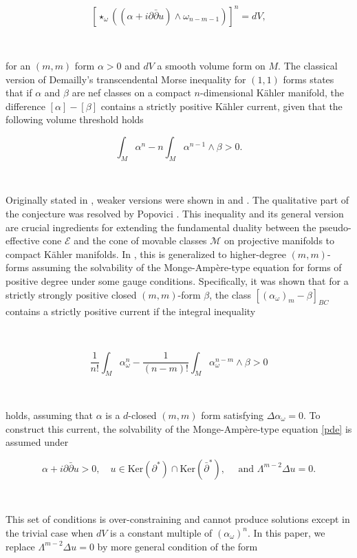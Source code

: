 \documentclass[11pt,letterpaper]{amsart}
\newcommand{\spartial}{\partial^*}
\newcommand{\pbp}{\partial \bar{\partial}}
\newcommand{\Ker}{\mbox{Ker}}
\numberwithin{equation}{section}
\begin{document}
\begin{equation}\label{pde}
    \left[\star_{\omega}\left((\alpha + i \pbp u)\wedge \omega_{n-m-1}\right)\right]^n = dV,
\end{equation}

\

\noindent for an $(m,m)$ form $\alpha >0$ and $dV$ a smooth volume form on $M$. The classical version \cite{BDPP13,Popovici16} of Demailly's transcendental Morse inequality for $(1,1)$ forms states that if $\alpha$ and $\beta$ are nef classes on a compact $n$-dimensional K\"ahler manifold, the difference $[\alpha] - [\beta]$ contains a strictly positive K\"ahler current, given that the following volume threshold holds

$$\int_M \alpha^n - n \int_M \alpha^{n-1} \wedge \beta >0.$$


\

Originally stated in \cite[Conjecture $10.1$, $(ii)$]{BDPP13}, weaker versions were shown in \cite{BDPP13} and \cite{Xiao2015}. The qualitative part of the conjecture was resolved by Popovici \cite{Popovici16}. This inequality and its general version are crucial ingredients for extending the fundamental duality between the pseudo-effective cone $\mathcal{E}$ and the cone of movable classes $\mathcal{M}$ on projective manifolds to compact K\"ahler manifolds. In \cite{DP25}, this is generalized to higher-degree $(m,m)$-forms assuming the solvability of the Monge-Amp\`ere-type equation for forms of positive degree under some gauge conditions. Specifically, it was shown that for a strictly strongly positive closed $(m,m)$-form $\beta$, the class $[(\alpha_{\omega})_m - \beta]_{BC}$ contains a strictly positive current if the integral inequality

\ 


$$ \frac{1}{n!}\int_M \alpha_{\omega}^n - \frac{1}{(n-m)!}\int_M\alpha_{\omega}^{n-m}\wedge \beta >0  $$

\

\noindent holds, assuming that $\alpha$ is a $d$-closed $(m,m)$ form satisfying $\Delta \alpha_{\omega} = 0$. To construct this current, the solvability of the Monge-Ampère-type equation \eqref{pde} is assumed under

$$    \alpha + i \pbp u >0, \quad u \in \Ker (\spartial) \cap \Ker( \bar{\partial}^*), \quad \text{ and }\Lambda^{m-2} \Delta u =0.$$


\


This set of  conditions is over-constraining and cannot produce solutions except in the trivial case when $dV$ is a constant multiple of $(\alpha_{\omega})^n$. In this paper, we replace $\Lambda^{m-2} \Delta u =0$ by more general condition of the form
\end{document}
